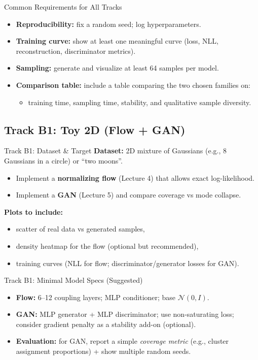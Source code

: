 \documentclass[aspectratio=169]{beamer}
\begin{document}
\begin{frame}{Common Requirements for All Tracks}
\small
\begin{itemize}
  \item \textbf{Reproducibility:} fix a random seed; log hyperparameters.
  \item \textbf{Training curve:} show at least one meaningful curve (loss, NLL, reconstruction, discriminator metrics).
  \item \textbf{Sampling:} generate and visualize at least 64 samples per model.
  \item \textbf{Comparison table:} include a table comparing the two chosen families on:
  \begin{itemize}
    \item training time, sampling time, stability, and qualitative sample diversity.
  \end{itemize}
\end{itemize}
\end{frame}

\subsection{Track B1: Toy 2D (Flow + GAN)}

\begin{frame}{Track B1: Dataset \& Target}
\small
\textbf{Dataset:} 2D mixture of Gaussians (e.g., 8 Gaussians in a circle) or ``two moons''.
\begin{itemize}
  \item Implement a \textbf{normalizing flow} (Lecture 4) that allows exact log-likelihood.
  \item Implement a \textbf{GAN} (Lecture 5) and compare coverage vs mode collapse.
\end{itemize}
\vspace{0.4em}
\textbf{Plots to include:}
\begin{itemize}
  \item scatter of real data vs generated samples,
  \item density heatmap for the flow (optional but recommended),
  \item training curves (NLL for flow; discriminator/generator losses for GAN).
\end{itemize}
\end{frame}

\begin{frame}{Track B1: Minimal Model Specs (Suggested)}
\small
\begin{itemize}
  \item \textbf{Flow:} 6--12 coupling layers; MLP conditioner; base $\mathcal{N}(0,I)$.
  \item \textbf{GAN:} MLP generator + MLP discriminator; use non-saturating loss; consider gradient penalty as a stability add-on (optional).
  \item \textbf{Evaluation:} for GAN, report a simple \emph{coverage metric} (e.g., cluster assignment proportions) + show multiple random seeds.
\end{itemize}
\end{frame}
\end{document}
